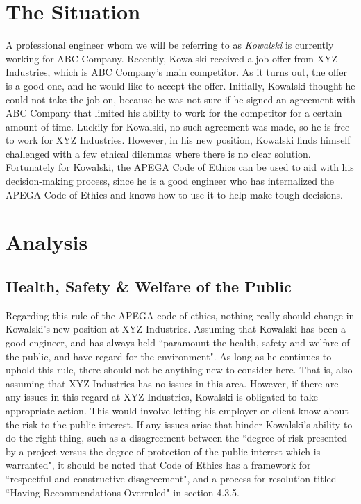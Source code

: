 \documentclass[letterpaper,12pt]{article}
\begin{document}
\section{The Situation}
A professional engineer whom we will be referring to as \textit{Kowalski} is currently working for ABC Company.
Recently, Kowalski received a job offer from XYZ Industries, which is ABC Company's main competitor. As it turns out,
the offer is a good one, and he would like to accept the offer. Initially, Kowalski thought he could not take 
the job on, because he was not sure if he signed an agreement with ABC Company that limited his ability to work for the
competitor for a certain amount of time. Luckily for Kowalski, no such agreement was made, so he is free to work for XYZ Industries.
However, in his new position, Kowalski finds himself challenged with a few ethical dilemmas where there is no clear solution.
Fortunately for Kowalski, the APEGA Code of Ethics can be used to aid with his decision-making process, since he is
a good engineer who has internalized the APEGA Code of Ethics and knows how to use it to help make tough decisions.


\section{Analysis}
\subsection{Health, Safety \& Welfare of the Public}
Regarding this rule of the APEGA code of ethics, nothing really should change in Kowalski's new position at XYZ Industries.
Assuming that Kowalski has been a good engineer, and has always held ``paramount the health, safety and welfare of the public, and have regard for the
environment"\cite{apegacode}. As long as he continues to uphold this rule, there should not be anything new to consider here. That is,
also assuming that XYZ Industries has no issues in this area. However, if there are any issues in this regard at XYZ Industries, Kowalski is obligated to take appropriate action.
This would involve letting his employer or client know about the risk to the public interest.
If any issues arise that hinder Kowalski's ability to do the right thing, such as a disagreement between the ``degree of risk presented by a project versus the degree of
protection of the public interest which is warranted"\cite{apegacode}, it should be noted that Code of Ethics has a framework for ``respectful and constructive disagreement", 
and a process for resolution titled ``Having Recommendations Overruled" in section 4.3.5.
\end{document}
